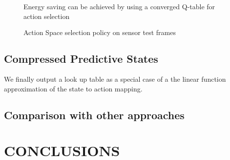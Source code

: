 \documentclass[letterpaper, 10pt, conference]{IEEEtran} %
\begin{document}
  
  \begin{figure}
    \centering
\caption{Energy saving can be achieved by using a converged Q-table for action selection}
    \label{fig:res1}
  \end{figure}
  
  
  \begin{figure}
    \centering
\caption{Action Space selection policy on sensor test frames}
    \label{fig:res2}
  \end{figure}

  

\subsection{Compressed Predictive States}
We finally output a look up table as a special case of a the linear function approximation of the state to action mapping.

\subsection{Comparison with other approaches}







\section{CONCLUSIONS} \label{sec:conclusions}
\end{document}
